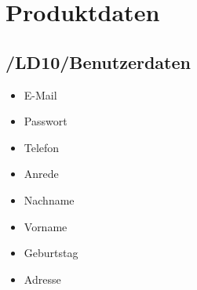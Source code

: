 
\section{Produktdaten}
\subsection*{/LD10/Benutzerdaten}
\begin{itemize}
	\item E-Mail
	\item Passwort
	\item Telefon
	\item Anrede
	\item Nachname
	\item Vorname
	\item Geburtstag
	\item Adresse
\end{itemize}